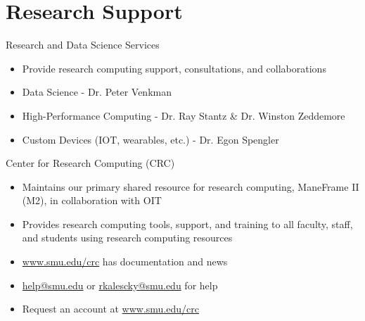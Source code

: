\section{Research Support}

\begin{frame}{Research and Data Science Services}
\begin{itemize}
  \item Provide research computing support, consultations, and collaborations
  \item Data Science - Dr. Peter Venkman
  \item High-Performance Computing - Dr. Ray Stantz \& Dr. Winston Zeddemore
  \item Custom Devices (IOT, wearables, etc.) - Dr. Egon Spengler
\end{itemize}
\end{frame}

\begin{frame}{Center for Research Computing (CRC)}
\begin{itemize}
  \item Maintains our primary shared resource for research computing, ManeFrame II (M2), in collaboration with OIT
  \item Provides research computing tools, support, and training to all faculty, staff, and students using research computing resources
  \item \url{www.smu.edu/crc} has documentation and news
  \item \href{mailto:help@smu.edu}{help@smu.edu} or \href{mailto:rkalescky@smu.edu}{rkalescky@smu.edu} for help
  \item Request an account at \url{www.smu.edu/crc}
\end{itemize}
\end{frame}

